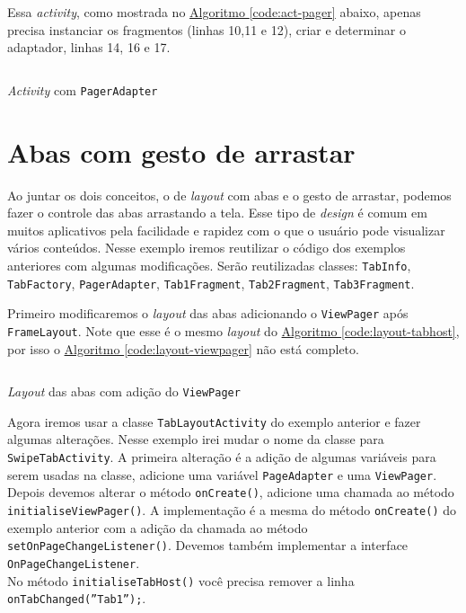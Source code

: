 \documentclass[a4paper,12pt,brazil,oneside]{book}
\begin{document}
	Essa \emph{activity}, como mostrada no \hyperref[code:act-pager]{Algoritmo \ref*{code:act-pager}} abaixo, apenas precisa instanciar os fragmentos (linhas 10,11 e 12), criar e determinar o adaptador, linhas 14, 16 e 17.
	
	\begin{listing}[H]
	\inputminted[linenos=true,fontsize=\small,frame=lines, framesep=2mm, tabsize=2,numbersep=5pt]{java}{src/design/viewpager-activity.java}
	\caption{\emph{Activity} com \texttt{PagerAdapter}}
	\label{code:act-pager}
	\end{listing}

\section{Abas com gesto de arrastar}

	Ao juntar os dois conceitos, o de \emph{layout} com abas e o gesto de arrastar, podemos fazer o controle das abas arrastando a tela. Esse tipo de \emph{design} é comum em muitos aplicativos pela facilidade e rapidez com o que o usuário pode visualizar vários conteúdos. 
	Nesse exemplo iremos reutilizar o código dos exemplos anteriores com algumas modificações. Serão reutilizadas classes: \texttt{TabInfo}, \texttt{TabFactory}, \texttt{PagerAdapter}, \texttt{Tab1Fragment}, \texttt{Tab2Fragment}, \texttt{Tab3Fragment}.
	
	Primeiro modificaremos o \emph{layout} das abas adicionando o \texttt{ViewPager} após \texttt{FrameLayout}. Note que esse é o mesmo \emph{layout} do \hyperref[code:layout-tabhost]{Algoritmo \ref*{code:layout-tabhost}}, por isso o \hyperref[code:layout-viewpager]{Algoritmo \ref*{code:layout-viewpager}} não está completo.
	
	\begin{listing}[H]
	\inputminted[linenos=true,fontsize=\small,frame=lines, framesep=2mm, tabsize=2,numbersep=5pt]{xml}{src/design/swipetabs-layout.xml}
	\caption{\emph{Layout} das abas com adição do \texttt{ViewPager}}
	\label{code:layout-viewpager}
	\end{listing}
	
	Agora iremos usar a classe \texttt{TabLayoutActivity} do exemplo anterior e fazer algumas alterações.  Nesse exemplo irei mudar o nome da classe para \texttt{SwipeTabActivity}. A primeira alteração é a adição de algumas variáveis para serem usadas na classe, adicione uma variável \texttt{PageAdapter} e uma \texttt{ViewPager}. Depois devemos alterar o método \texttt{onCreate()}, adicione uma chamada ao método \texttt{initialiseViewPager()}. A implementação é a mesma do método \texttt{onCreate()} do exemplo anterior com a adição da chamada ao método \\ \texttt{setOnPageChangeListener()}. Devemos também implementar a interface \\ \texttt{OnPageChangeListener}.\\ No método \texttt{initialiseTabHost()} você precisa remover a linha \texttt{onTabChanged(''Tab1'');}.
	
\end{document}
